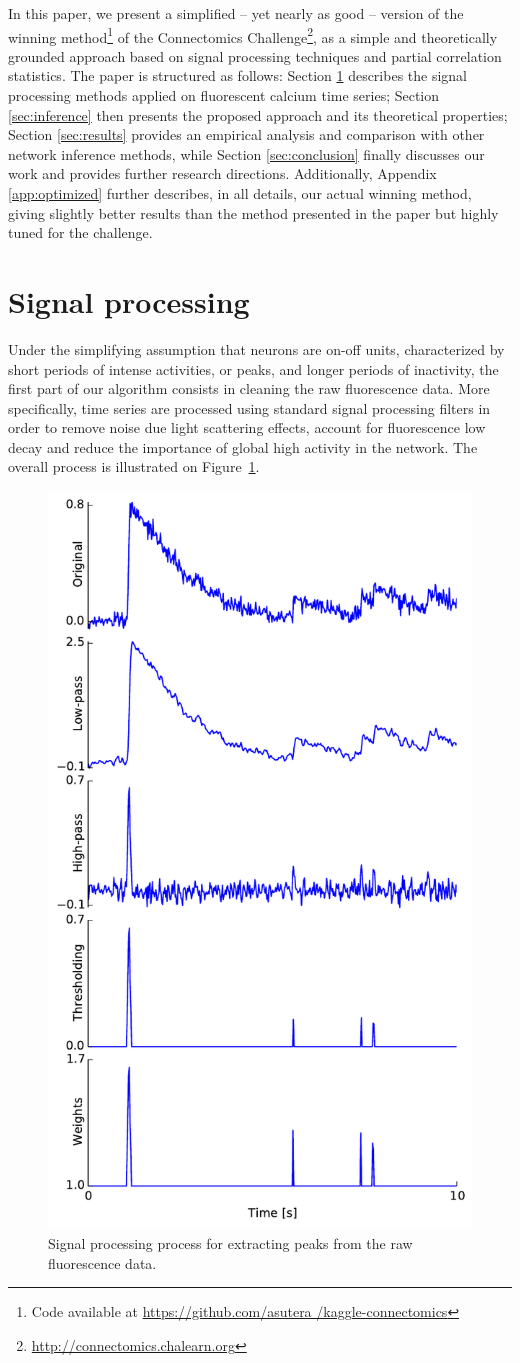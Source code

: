 \documentclass[wcp]{jmlr}
\begin{document}
In this paper, we present a simplified -- yet nearly as good -- version of the
winning method\footnote{Code available at \url{https://github.com/asutera
/kaggle-connectomics}} of the Connectomics
Challenge\footnote{\url{http://connectomics.chalearn.org}}, as a simple and
theoretically grounded approach based on signal processing techniques and
partial correlation statistics. The paper is structured as follows: Section
\ref{sec:filter} describes the signal processing methods applied on fluorescent
calcium time series; Section \ref{sec:inference} then presents the proposed
approach and its theoretical properties; Section \ref{sec:results} provides an
empirical analysis and comparison with other network inference methods, while
Section \ref{sec:conclusion} finally discusses our work and provides further
research directions. Additionally, Appendix \ref{app:optimized} further
describes, in all details, our actual winning method, giving slightly better
results than the method presented in the paper but highly tuned for the
challenge.


\section{Signal processing} \label{sec:filter}

Under the simplifying assumption that neurons are on-off units, characterized
by short periods of intense activities, or peaks, and longer periods of
inactivity, the first part of our algorithm consists in cleaning the raw
fluorescence data. More specifically, time series are processed using standard
signal processing filters in order to remove noise due light scattering
effects, account for fluorescence  low decay and reduce the importance of
global high activity in the network. The overall process is illustrated on
Figure~\ref{fig:filtered-signal}.

\begin{figure}
\centering
\includegraphics[width=0.4\linewidth]{images/fig_filtering}
\caption{Signal processing process for extracting peaks from the raw fluorescence data.}
\label{fig:filtered-signal}
\end{figure}
\end{document}
